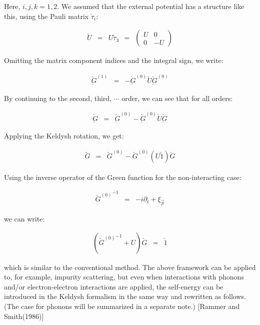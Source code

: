 \documentclass[uplatex,a4j,12pt,dvipdfmx]{jsarticle}
\begin{document}
Here, $i,j,k=1,2$. We assumed that the external potential has a structure like this, using the Pauli matrix $\check{\tau}_{i}$:

\begin{eqnarray}
	\check{U}
	&=&
	U \check{\tau}_{3}
	\ \ = \ \
	\left(
	\begin{array}{ll}
			U & 0
			\\
			0 & -U
		\end{array}
	\right)
\end{eqnarray}

Omitting the matrix component indices and the integral sign, we write:

\begin{eqnarray}
	\check{\underbar{G}}^{(1)}
	&=&
	-
	\check{\underbar{G}}^{(0)}
	\check{U}
	\check{\underbar{G}}^{(0)}
\end{eqnarray}

By continuing to the second, third, $\cdots$ order, we can see that for all orders:

\begin{eqnarray}
	\check{\underbar{G}}
	&=&
	\check{\underbar{G}}^{(0)}
	-
	\check{\underbar{G}}^{(0)}
	\check{U}
	\check{\underbar{G}}
\end{eqnarray}

Applying the Keldysh rotation, we get:

\begin{eqnarray}
	\check{G}
	&=&
	\check{G}^{(0)}
	-
	\check{G}^{(0)}
	(U \check{1})
	\check{G}
\end{eqnarray}

Using the inverse operator of the Green function for the non-interacting case:

\begin{eqnarray}
	{{\check{G}}^{(0)}{}}^{-1}
	&=&
	- i \partial_{t} + \xi_{\vec{p}}
\end{eqnarray}

we can write:

\begin{eqnarray}
	({{\check{G}}^{(0)}{}}^{-1} + U ) \check{G}
	&=&
	\check{1}
\end{eqnarray}

which is similar to the conventional method.
The above framework can be applied to, for example, impurity scattering, but even when interactions with phonons and/or electron-electron interactions are applied, the self-energy can be introduced in the Keldysh formalism in the same way and rewritten as follows.
(The case for phonons will be summarized in a separate note.)
[Rammer and Smith(1986)]
\end{document}
